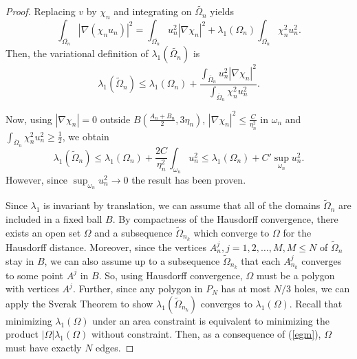 \documentclass[12pt]{report}
\numberwithin{definition}{section}
\begin{document}
\begin{proof}
  Replacing $v$ by $\chi_{n}$ and integrating on $\widetilde{\Omega_{n}}$ yields
  \[
    \int_{ \overline{\Omega_{n}}} \! | \nabla (\chi_{n}u_{n}) |^2 = \int_{ \overline{\Omega_{n}}} \! u_{n}^{2}| \nabla \chi_{n} |^2 + \lambda_{1}(\Omega_{n}) \int_{ \overline{\Omega_{n}}} \! \chi_{n}^2 u_{n}^2  
  .\] 
  Then, the variational definition of $\lambda_{1}(\widetilde{\Omega_{n}})$ is
  \[
  \lambda_{1}(\widetilde{\Omega}_{n}) \leq \lambda_{1}(\Omega_{n}) + \frac{\int_{ \overline{\Omega}_{n}} \! u_{n}^2 | \nabla \chi_{n} |^2 }{\int_{ \overline{\Omega}_{n}} \! \chi_{n}^2 u_{n}^2 }
  .\] 

  Now, using $| \nabla \chi_{n} | = 0$ outside $B(\frac{A_{n} + B_{n}}{2}, 3\eta_{n})$, $| \nabla \chi_{n} |^2 \leq \frac{C}{\eta_{n}^{2}}$ in $\omega_{n}$ and $\int_{ \overline{\Omega}_{n}} \! \chi_{n}^{2}u_{n}^{2} \geq \frac{1}{2} $, we obtain
  \[
  \lambda_{1}(\widetilde{\Omega}_{n}) \leq \lambda_{1}(\Omega_{n}) + \frac{2C}{\eta_{n}^{2}} \int_{ \omega_{n}} \! u_{n}^{2} \leq \lambda_{1}(\Omega_{n}) + C' \sup_{\omega_{n}} u_{n}^{2} 
  .\] 
  However, since $\sup_{\omega_{n}} u_{n}^{2} \to 0$ the result has been proven.

  Since $\lambda_{1}$ is invariant by translation, we can assume that all of the domains $\widetilde{\Omega}_{n}$ are included in a fixed ball $B$.
  By compactness of the Hausdorff convergence, there exists an open set $\Omega$ and a subsequence $\widetilde{\Omega}_{n_{k}}$ which converge to $\Omega$ for the Hausdorff distance.
  Moreover, since the vertices $A_{n}^{j}, j = 1,2,\ldots,M, M \leq N$ of $\widetilde{\Omega}_{n}$ stay in $B$, we can also assume up to a subsequence $\widetilde{\Omega}_{n_{k}}$ that each $A_{n_{k}}^{j}$ converges to some point $A^{j}$ in $B$.
  So, using Hausdorff convergence, $\Omega$ must be a polygon with vertices $A^{j}$.
  Further, since any polygon in $P_{N}$ has at most $N / 3$ holes, we can apply the Sverak Theorem to show $\lambda_{1}(\widetilde{\Omega}_{n_{k}})$ converges to $\lambda_{1}(\Omega)$.
  Recall that minimizing $\lambda_{1}(\Omega)$ under an area constraint is equivalent to minimizing the product $| \Omega |\lambda_{1}(\Omega)$ without constraint.
  Then, as a consequence of (\ref{egm}), $\Omega$ must have exactly $N$ edges.
\end{proof}
\end{document}
